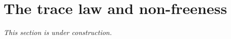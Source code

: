 \section{The trace law and non-freeness}\label{sec:partII-I}

\emph{This section is under construction.}
